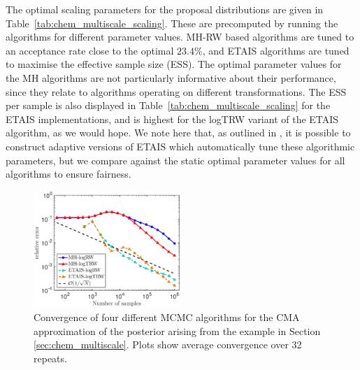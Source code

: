 \documentclass[final]{siamltex}
\newcommand{\edit}[1]{#1}
\begin{document}
The optimal scaling parameters for the proposal distributions are
given in Table~\ref{tab:chem_multiscale_scaling}. These are
precomputed by running the algorithms for different parameter
values. MH-RW based algorithms are tuned to an acceptance rate close
to the optimal $23.4\%$, and ETAIS algorithms are tuned to maximise the
effective sample size (ESS). The optimal parameter values for the MH
algorithms are not particularly informative about their performance,
since they relate to algorithms operating on different
transformations. \edit{The ESS per sample is also displayed in
Table~\ref{tab:chem_multiscale_scaling} for the ETAIS implementations,
and is highest for the logTRW variant
of the ETAIS algorithm, as we would hope.} We note here that, as
outlined in \cite{cotter2015parallel}, it is possible to construct
adaptive versions of ETAIS which automatically tune these algorithmic
parameters, but we compare against the static optimal parameter values
for all algorithms to ensure fairness.

\begin{figure}[!htb]
\centering
\includegraphics[width=0.495\textwidth]{"images/CMA_L2_log_space"}
\caption{Convergence of four different MCMC algorithms for the CMA
  approximation of the  posterior arising from the example in Section
  \ref{sec:chem_multiscale}. \edit{Plots show average
    convergence over 32 repeats.}}
\label{fig:chem_multiscale_L2}
\end{figure}
\end{document}
